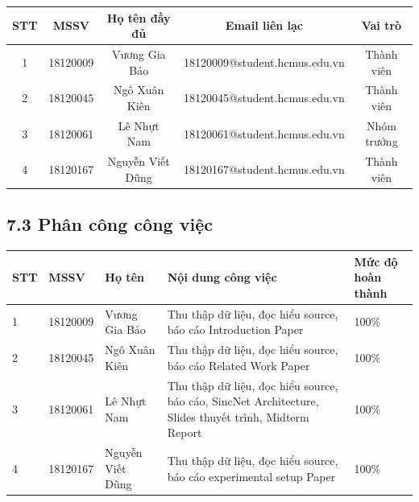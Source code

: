 \documentclass{article}
\newcommand\T{\rule{0pt}{2.6ex}}       %
\newcommand\B{\rule[-1.2ex]{0pt}{0pt}} %
\begin{document}
	\begin{center}
		\begin{tabular}{ | c | c | c | c | c |}\hline
			STT	& MSSV & Họ tên đầy đủ & Email liên lạc & Vai trò\T\B\\\hline
			1 & 18120009 & Vương Gia Bảo & 18120009@student.hcmus.edu.vn  & Thành viên \T\B\\ \hline
			2 & 18120045 & Ngô Xuân Kiên & 18120045@student.hcmus.edu.vn & Thành viên\T\B\\ \hline
			3 & 18120061 & Lê Nhựt Nam & 18120061@student.hcmus.edu.vn & Nhóm trưởng \T\B\\ \hline
			4 & 18120167 & Nguyễn Viết Dũng &  18120167@student.hcmus.edu.vn & Thành viên \T\B\\ \hline
		\end{tabular}
	\end{center}

	\subsection{7.3 Phân công công việc}
	\begin{center}
		\begin{tabular}{ | l | l | l | p{5.5cm} | p{3cm} |}
			\hline
			STT & MSSV & Họ tên & Nội dung công việc & Mức độ hoàn thành  \\ \hline
			1 & 18120009 & Vương Gia Bảo & Thu thập dữ liệu, đọc hiểu source, báo cáo Introduction Paper &  100\%\T\B\\ \hline
			2 & 18120045 & Ngô Xuân Kiên & Thu thập dữ liệu, đọc hiểu source, báo cáo Related Work Paper & 100\%\T\B \\ \hline
			3 & 18120061 & Lê Nhựt Nam & Thu thập dữ liệu, đọc hiểu source, báo cáo, SincNet Architecture, Slides thuyết trình, Midterm Report & 100\%\T\B \\ \hline
			4 & 18120167 & Nguyễn Viết Dũng &  Thu thập dữ liệu, đọc hiểu source, báo cáo experimental setup Paper & 100\%\T\B \\ \hline
		\end{tabular}
	\end{center}
	\nocite{*}
	\newpage\cleardoublepage
	
	
\end{document}

